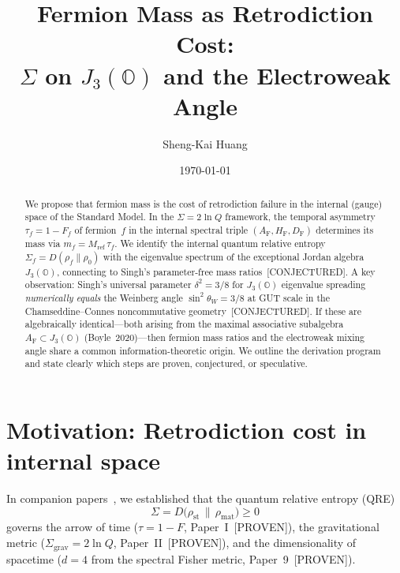 \documentclass[prl,twocolumn,superscriptaddress,longbibliography]{revtex4-2}
\newcommand{\AF}{A_{\mathrm{F}}}
\newcommand{\DF}{D_{\mathrm{F}}}
\newcommand{\HF}{H_{\mathrm{F}}}
\newcommand{\Mref}{M_{\mathrm{ref}}}
\newcommand{\JO}{J_3(\mathbb{O})}
\begin{document}
\title{Fermion Mass as Retrodiction Cost:\\
  $\Sigma$ on $J_3(\mathbb{O})$ and the Electroweak Angle}

\author{Sheng-Kai Huang}

\date{\today}

\begin{abstract}
We propose that fermion mass is the cost of retrodiction
failure in the internal (gauge) space of the Standard Model.
In the $\Sigma = 2\ln Q$ framework, the temporal asymmetry
$\tau_f = 1 - F_f$ of fermion~$f$ in the internal spectral
triple $(\AF, \HF, \DF)$ determines its mass via
$m_f = \Mref\,\tau_f$.
We identify the internal quantum relative entropy
$\Sigma_f = D(\rho_f \| \rho_0)$ with the eigenvalue spectrum
of the exceptional Jordan algebra~$\JO$, connecting to Singh's
parameter-free mass ratios~[CONJECTURED].
A key observation: Singh's universal parameter $\delta^2 = 3/8$
for $\JO$ eigenvalue spreading \emph{numerically equals}
the Weinberg angle $\sin^2\theta_W = 3/8$ at GUT scale
in the Chamseddine--Connes noncommutative geometry~[CONJECTURED].
If these are algebraically identical---both arising from the
maximal associative subalgebra $\AF \subset \JO$
(Boyle~2020)---then fermion mass ratios and the electroweak
mixing angle share a common information-theoretic origin.
We outline the derivation program and state clearly which
steps are proven, conjectured, or speculative.
\end{abstract}

\maketitle


\section{Motivation: Retrodiction cost in internal space}
\label{sec:motivation}

In companion papers~\cite{PaperI,PaperII,Paper9}, we established
that the quantum relative entropy (QRE)
\begin{equation}\label{eq:Sigma}
  \Sigma = D\bigl(\rho_{\mathrm{st}}
  \,\big\|\, \rho_{\mathrm{mat}}\bigr) \geq 0
\end{equation}
governs the arrow of time ($\tau = 1 - F$, Paper~I~[PROVEN]),
the gravitational metric ($\Sigma_{\mathrm{grav}} = 2\ln Q$,
Paper~II~[PROVEN]), and the dimensionality of spacetime
($d=4$ from the spectral Fisher metric,
Paper~9~[PROVEN]).
\end{document}
